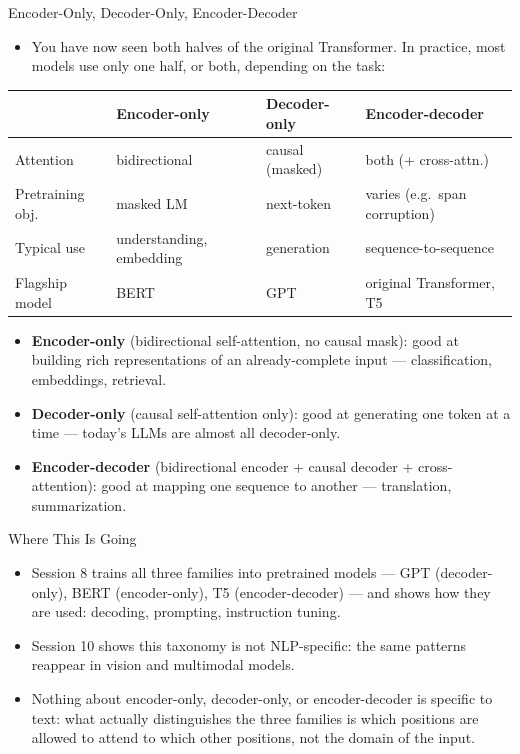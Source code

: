 \begin{vbframe}{Encoder-Only, Decoder-Only, Encoder-Decoder}
\begin{itemize}
  \item You have now seen both halves of the original Transformer. In practice, most models use only one half, or both, depending on the task:
\end{itemize}
\begin{center}
\footnotesize
\begin{tabular}{@{}p{2.1cm}p{2.8cm}p{2.6cm}p{3.2cm}@{}}
\toprule
 & \textbf{Encoder-only} & \textbf{Decoder-only} & \textbf{Encoder-decoder} \\
\midrule
Attention & bidirectional & causal (masked) & both (+ cross-attn.) \\[2pt]
Pretraining obj. & masked LM & next-token & varies (e.g.\ span corruption) \\[2pt]
Typical use & understanding, embedding & generation & sequence-to-sequence \\[2pt]
Flagship model & BERT & GPT & original Transformer, T5 \\
\bottomrule
\end{tabular}
\end{center}
\begin{itemize}
  \item \textbf{Encoder-only} (bidirectional self-attention, no causal mask): good at building rich representations of an already-complete input --- classification, embeddings, retrieval.
  \item \textbf{Decoder-only} (causal self-attention only): good at generating one token at a time --- today's LLMs are almost all decoder-only.
  \item \textbf{Encoder-decoder} (bidirectional encoder + causal decoder + cross-attention): good at mapping one sequence to another --- translation, summarization.
\end{itemize}
\end{vbframe}

\begin{vbframe}{Where This Is Going}
\begin{itemize}
  \item Session 8 trains all three families into pretrained models --- GPT (decoder-only), BERT (encoder-only), T5 (encoder-decoder) --- and shows how they are used: decoding, prompting, instruction tuning.
  \item Session 10 shows this taxonomy is not NLP-specific: the same patterns reappear in vision and multimodal models.
  \item Nothing about encoder-only, decoder-only, or encoder-decoder is specific to text: what actually distinguishes the three families is which positions are allowed to attend to which other positions, not the domain of the input.
\end{itemize}
\end{vbframe}

